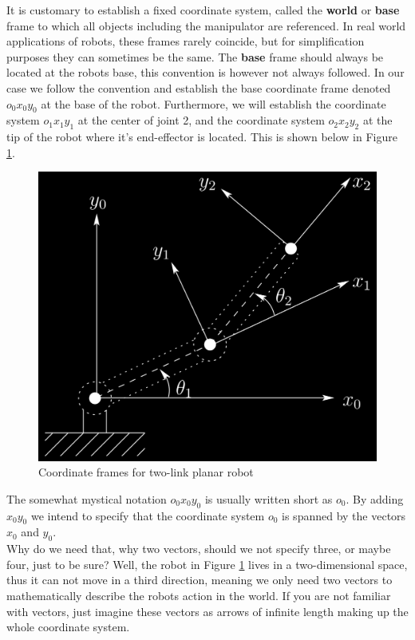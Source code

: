 	It is customary to establish a fixed coordinate system, called the \textbf{world} or \textbf{base} frame
	to which all objects including the manipulator are referenced. In real world applications of robots, these frames rarely coincide, but for simplification purposes they can sometimes be the same. The \textbf{base} frame should always be located at the robots base, this convention is however not always followed. In our case we follow the convention and establish the base coordinate frame denoted $o_{0}x_{0}y_{0}$ at the base of the robot. Furthermore, we will establish the coordinate system $o_{1}x_{1}y_{1}$ at the center of joint 2, and the coordinate system $o_{2}x_{2}y_{2}$ at the tip of the robot where it's end-effector is located. This is shown below in Figure \ref{fig:Figure1_25}.

	\begin{figure}[H]
		\centering
		\includegraphics[width=1\textwidth]{img/Figure1_25.png}
		\caption{Coordinate frames for two-link planar robot}
		\label{fig:Figure1_25}
	\end{figure}

	The somewhat mystical notation $o_{0}x_{0}y_{0}$ is usually written short as $o_{0}$. By adding $x_{0}y_{0}$ we intend to specify that the coordinate system $o_{0}$ is spanned by the vectors $x_{0}$ and $y_{0}$.\\ Why do we need that, why two vectors, should we not specify three, or maybe four, just to be sure? Well, the robot in Figure \ref{fig:Figure1_25} lives in a two-dimensional space, thus it can not move in a third direction, meaning we only need two vectors to mathematically describe the robots action in the world. If you are not familiar with vectors, just imagine these vectors as arrows of infinite length making up the whole coordinate system.\\

